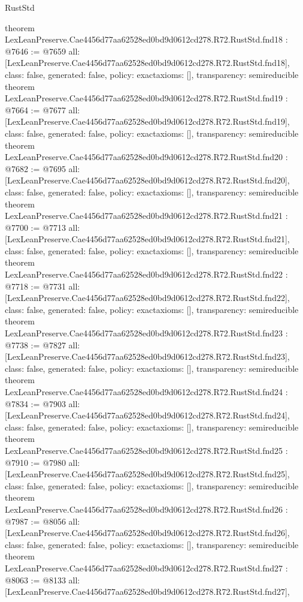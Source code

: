 \begin{lexlean}{RustStd}
\begin{coremodule}
{}
theorem LexLeanPreserve.Cae4456d77aa62528ed0bd9d0612cd278.R72.RustStd.fnd18 : @7646 := @7659 {
  all: [LexLeanPreserve.Cae4456d77aa62528ed0bd9d0612cd278.R72.RustStd.fnd18],
  class: false,
  generated: false,
  policy: exact{axioms: []},
  transparency: semireducible
}
theorem LexLeanPreserve.Cae4456d77aa62528ed0bd9d0612cd278.R72.RustStd.fnd19 : @7664 := @7677 {
  all: [LexLeanPreserve.Cae4456d77aa62528ed0bd9d0612cd278.R72.RustStd.fnd19],
  class: false,
  generated: false,
  policy: exact{axioms: []},
  transparency: semireducible
}
theorem LexLeanPreserve.Cae4456d77aa62528ed0bd9d0612cd278.R72.RustStd.fnd20 : @7682 := @7695 {
  all: [LexLeanPreserve.Cae4456d77aa62528ed0bd9d0612cd278.R72.RustStd.fnd20],
  class: false,
  generated: false,
  policy: exact{axioms: []},
  transparency: semireducible
}
theorem LexLeanPreserve.Cae4456d77aa62528ed0bd9d0612cd278.R72.RustStd.fnd21 : @7700 := @7713 {
  all: [LexLeanPreserve.Cae4456d77aa62528ed0bd9d0612cd278.R72.RustStd.fnd21],
  class: false,
  generated: false,
  policy: exact{axioms: []},
  transparency: semireducible
}
theorem LexLeanPreserve.Cae4456d77aa62528ed0bd9d0612cd278.R72.RustStd.fnd22 : @7718 := @7731 {
  all: [LexLeanPreserve.Cae4456d77aa62528ed0bd9d0612cd278.R72.RustStd.fnd22],
  class: false,
  generated: false,
  policy: exact{axioms: []},
  transparency: semireducible
}
theorem LexLeanPreserve.Cae4456d77aa62528ed0bd9d0612cd278.R72.RustStd.fnd23 : @7738 := @7827 {
  all: [LexLeanPreserve.Cae4456d77aa62528ed0bd9d0612cd278.R72.RustStd.fnd23],
  class: false,
  generated: false,
  policy: exact{axioms: []},
  transparency: semireducible
}
theorem LexLeanPreserve.Cae4456d77aa62528ed0bd9d0612cd278.R72.RustStd.fnd24 : @7834 := @7903 {
  all: [LexLeanPreserve.Cae4456d77aa62528ed0bd9d0612cd278.R72.RustStd.fnd24],
  class: false,
  generated: false,
  policy: exact{axioms: []},
  transparency: semireducible
}
theorem LexLeanPreserve.Cae4456d77aa62528ed0bd9d0612cd278.R72.RustStd.fnd25 : @7910 := @7980 {
  all: [LexLeanPreserve.Cae4456d77aa62528ed0bd9d0612cd278.R72.RustStd.fnd25],
  class: false,
  generated: false,
  policy: exact{axioms: []},
  transparency: semireducible
}
theorem LexLeanPreserve.Cae4456d77aa62528ed0bd9d0612cd278.R72.RustStd.fnd26 : @7987 := @8056 {
  all: [LexLeanPreserve.Cae4456d77aa62528ed0bd9d0612cd278.R72.RustStd.fnd26],
  class: false,
  generated: false,
  policy: exact{axioms: []},
  transparency: semireducible
}
theorem LexLeanPreserve.Cae4456d77aa62528ed0bd9d0612cd278.R72.RustStd.fnd27 : @8063 := @8133 {
  all: [LexLeanPreserve.Cae4456d77aa62528ed0bd9d0612cd278.R72.RustStd.fnd27],
}
\end{coremodule}
\end{lexlean}

